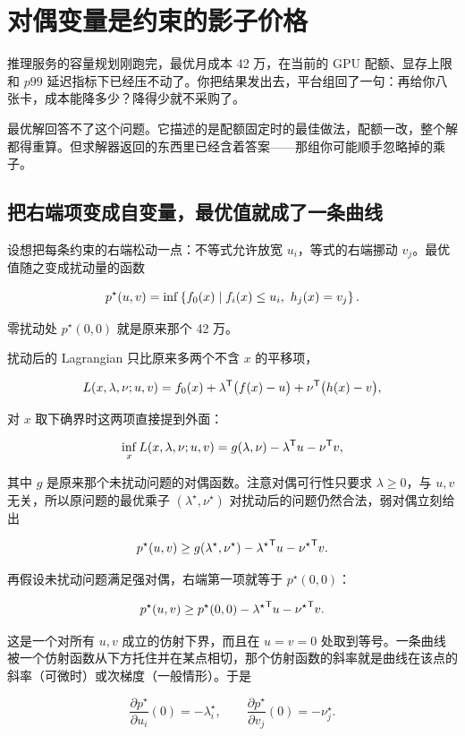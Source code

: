 \section{对偶变量是约束的影子价格}
\label{sec:09-Convex-Optimization/05-Duality/04}

推理服务的容量规划刚跑完，最优月成本 42 万，在当前的 GPU 配额、显存上限和 \(p99\) 延迟指标下已经压不动了。你把结果发出去，平台组回了一句：再给你八张卡，成本能降多少？降得少就不采购了。

最优解回答不了这个问题。它描述的是配额固定时的最佳做法，配额一改，整个解都得重算。但求解器返回的东西里已经含着答案——那组你可能顺手忽略掉的乘子。

\subsection{把右端项变成自变量，最优值就成了一条曲线}

设想把每条约束的右端松动一点：不等式允许放宽 \(u_i\)，等式的右端挪动 \(v_j\)。最优值随之变成扰动量的函数

\[
p^\star(u,v)=\inf\left\{f_0(x)\mid f_i(x)\le u_i,\ h_j(x)=v_j\right\}.
\]

零扰动处 \(p^\star(0,0)\) 就是原来那个 42 万。

扰动后的 Lagrangian 只比原来多两个不含 \(x\) 的平移项，

\[
L(x,\lambda,\nu;u,v)=f_0(x)+\lambda^{\mathsf{T}}\bigl(f(x)-u\bigr)+\nu^{\mathsf{T}}\bigl(h(x)-v\bigr),
\]

对 \(x\) 取下确界时这两项直接提到外面：

\[
\inf_x L(x,\lambda,\nu;u,v)=g(\lambda,\nu)-\lambda^{\mathsf{T}}u-\nu^{\mathsf{T}}v,
\]

其中 \(g\) 是原来那个未扰动问题的对偶函数。注意对偶可行性只要求 \(\lambda\ge0\)，与 \(u,v\) 无关，所以原问题的最优乘子 \((\lambda^\star,\nu^\star)\) 对扰动后的问题仍然合法，弱对偶立刻给出

\[
p^\star(u,v)\ge g(\lambda^\star,\nu^\star)-{\lambda^\star}^{\mathsf{T}}u-{\nu^\star}^{\mathsf{T}}v.
\]

再假设未扰动问题满足强对偶，右端第一项就等于 \(p^\star(0,0)\)：

\[
p^\star(u,v)\ge p^\star(0,0)-{\lambda^\star}^{\mathsf{T}}u-{\nu^\star}^{\mathsf{T}}v.
\]

这是一个对所有 \(u,v\) 成立的仿射下界，而且在 \(u=v=0\) 处取到等号。一条曲线被一个仿射函数从下方托住并在某点相切，那个仿射函数的斜率就是曲线在该点的斜率（可微时）或次梯度（一般情形）。于是

\[
\frac{\partial p^\star}{\partial u_i}(0)=-\lambda_i^\star,
\qquad
\frac{\partial p^\star}{\partial v_j}(0)=-\nu_j^\star.
\]

